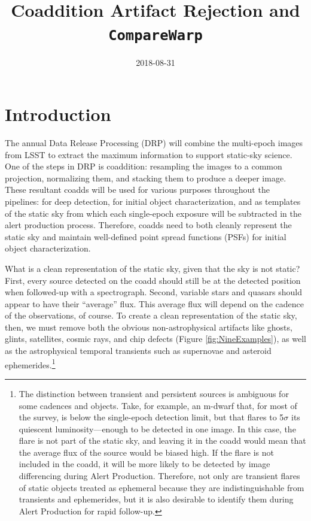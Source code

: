 \documentclass[DM,authoryear,toc]{lsstdoc}
\title{Coaddition Artifact Rejection and \texttt{CompareWarp}}
\date{2018-08-31}
\begin{document}
\maketitle


\section{Introduction}
The annual Data Release Processing (DRP) will combine the multi-epoch images from LSST to extract the maximum information to support static-sky science.
One of the steps in DRP is coaddition:  resampling the images to a common projection,  normalizing them, and stacking them to produce a deeper image.
These resultant coadds will be used for various purposes throughout the pipelines: for deep detection, for initial object characterization, and as templates of the static sky from which each single-epoch exposure will be subtracted in the alert production process.
Therefore, coadds need to both cleanly represent the static sky and  maintain well-defined point spread functions (PSFs) for initial object characterization.

What is a clean representation of the static sky, given that the sky is not static?
First, every source detected on the coadd should still be at the detected position when followed-up with a spectrograph.
Second, variable stars and quasars should appear to have their ``average'' flux.
This average flux will depend on the cadence of the observations, of course.
To create a clean representation of the static sky, then, we must remove both the obvious non-astrophysical artifacts like ghosts, glints, satellites, cosmic rays, and chip defects (Figure \ref{fig:NineExamples}),  as well as the astrophysical temporal transients such as supernovae and asteroid ephemerides.\footnote{The distinction between transient and persistent sources is ambiguous for some cadences and objects.
Take, for example, an m-dwarf that, for most of the survey, is below the single-epoch detection limit, but that flares to 5$\sigma$ its quiescent luminosity---enough to be detected in one image.
In this case, the flare is not part of the static sky, and leaving it in the coadd would mean that the average flux of the source would be biased high.
If the flare is not included in the coadd, it will be more likely to be detected by image differencing during Alert Production.
Therefore, not only are transient flares of static objects treated as ephemeral because they are indistinguishable from transients and ephemerides, but it is also desirable to identify them during Alert Production for rapid follow-up.}
\end{document}
